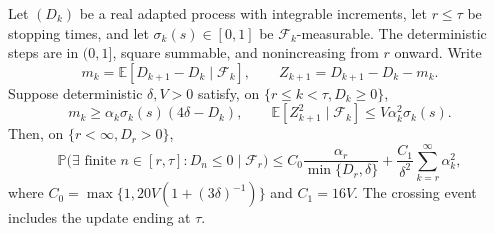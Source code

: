 \begin{lemma}\label{lem:barrier}
Let $(D_k)$ be a real adapted process with integrable increments, let $r\le\tau$ be stopping times, and let $\sigma_k(s)\in[0,1]$ be $\mathcal F_k$-measurable. The deterministic
steps are in $(0,1]$, square summable, and nonincreasing from $r$ onward. Write
\[
m_k=\mathbb E[D_{k+1}-D_k\mid\mathcal F_k],\qquad
Z_{k+1}=D_{k+1}-D_k-m_k.
\]
Suppose deterministic $\delta,V>0$ satisfy, on $\{r\le k<\tau,D_k\ge0\}$,
\begin{equation}\label{eq:barrierhyp}
m_k\ge\alpha_k\sigma_k(s)(4\delta-D_k),\qquad
\mathbb E[Z_{k+1}^2\mid\mathcal F_k]\le V\alpha_k^2\sigma_k(s).
\end{equation}
Then, on $\{r<\infty,D_r>0\}$,
\begin{equation}\label{eq:barrier}
\mathbb P\bigl(\exists\text{ finite }n\in[r,\tau]:D_n\le0\mid\mathcal F_r\bigr)
\le C_0\frac{\alpha_r}{\min\{D_r,\delta\}}+\frac{C_1}{\delta^2}\sum_{k=r}^{\infty}\alpha_k^2,
\end{equation}
where $C_0=\max\{1,20V(1+(3\delta)^{-1})\}$ and $C_1=16V$. The crossing event includes the update
ending at $\tau$.
\end{lemma}

